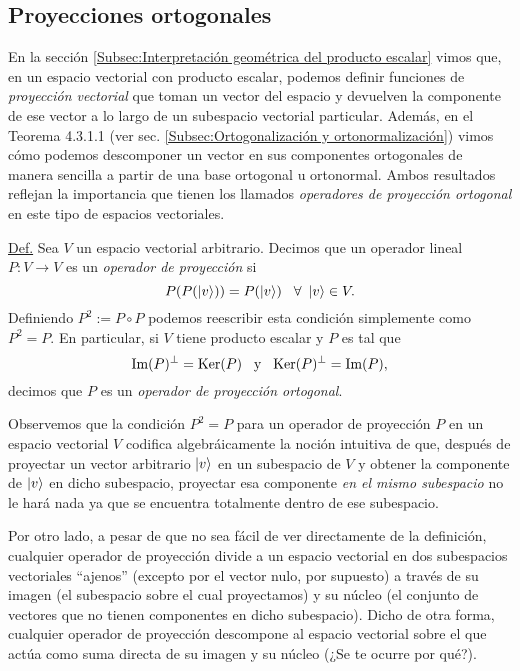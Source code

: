 \documentclass[12pt,dvipsnames]{article}
\begin{document}
\newpage
\subsection{Proyecciones ortogonales}

En la sección \ref{Subsec:Interpretación geométrica del producto escalar} vimos que, en un espacio vectorial con producto escalar, podemos definir funciones de \emph{proyección vectorial} que toman un vector del espacio y devuelven la componente de ese vector a lo largo de un subespacio vectorial particular. Además, en el Teorema 4.3.1.1 (ver sec. \ref{Subsec:Ortogonalización y ortonormalización}) vimos cómo podemos descomponer un vector en sus componentes ortogonales de manera sencilla a partir de una base ortogonal u ortonormal. Ambos resultados reflejan la importancia que tienen los llamados \emph{operadores de proyección ortogonal} en este tipo de espacios vectoriales.

\begin{tcolorbox}
    \underline{Def.} Sea $V$ un espacio vectorial arbitrario. Decimos que un operador lineal $P:V\to V$ es un \emph{operador de proyección} si \[
        P(P(\ket{v}))=P(\ket{v}) \hspace{3mm} \forall \ \ket{v}\in V.
    \] Definiendo $P^2:=P\circ P$ podemos reescribir esta condición simplemente como $P^2=P$. En particular, si $V$ tiene producto escalar y $P$ es tal que \[
        \text{Im}(P)^\perp=\text{Ker}(P)\hspace{3mm}\text{y}\hspace{3mm}\text{Ker}(P)^\perp=\text{Im}(P),
    \] decimos que $P$ es un \emph{operador de proyección ortogonal}.
\end{tcolorbox}

Observemos que la condición $P^2=P$ para un operador de proyección $P$ en un espacio vectorial $V$ codifica algebráicamente la noción intuitiva de que, después de proyectar un vector arbitrario $\ket{v}$ en un subespacio de $V$ y obtener la componente de $\ket{v}$ en dicho subespacio, proyectar esa componente \emph{en el mismo subespacio} no le hará nada \textemdash ya que se encuentra totalmente dentro de ese subespacio.

\vspace{3mm}
Por otro lado, a pesar de que no sea fácil de ver directamente de la definición, cualquier operador de proyección divide a un espacio vectorial en dos subespacios vectoriales ``ajenos'' (excepto por el vector nulo, por supuesto) a través de su imagen (el subespacio sobre el cual proyectamos) y su núcleo (el conjunto de vectores que no tienen componentes en dicho subespacio). Dicho de otra forma, cualquier operador de proyección descompone al espacio vectorial sobre el que actúa como suma directa de su imagen y su núcleo (¿Se te ocurre por qué?). 
\end{document}
